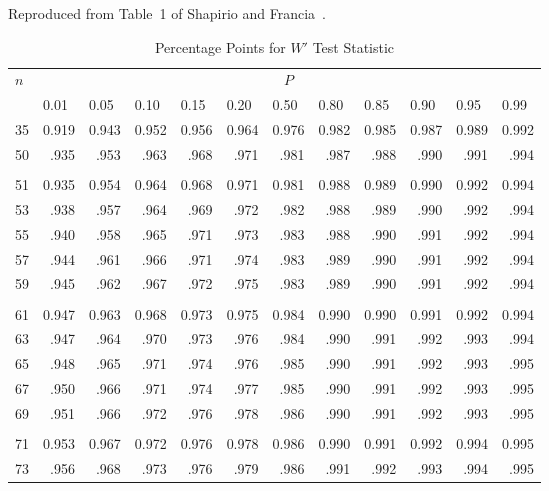 \documentclass[draft]{article}
\begin{document}
\begin{table}
\caption{Percentage Points for \(W'\) Test Statistic}
\centerline{Reproduced from Table~1 of Shapirio and Francia~\cite{shapiro72b}.}
\label{tbl:w-prime-test}
\scriptsize
\begin{center}
\begin{tabular}{l@{\extracolsep{1pt}}r%
                 @{\extracolsep{1pt}}r%
                 @{\extracolsep{1pt}}r%
                 @{\extracolsep{1pt}}rrrrrrrr}\hline
\(n\) & \multicolumn{11}{c}{\(P\)} \\ \cline{2-12}
&
\multicolumn{1}{l}{0.01} & 
\multicolumn{1}{l}{0.05} & 
\multicolumn{1}{l}{0.10} & 
\multicolumn{1}{l}{0.15} & 
\multicolumn{1}{l}{0.20} & 
\multicolumn{1}{l}{0.50} & 
\multicolumn{1}{l}{0.80} & 
\multicolumn{1}{l}{0.85} & 
\multicolumn{1}{l}{0.90} & 
\multicolumn{1}{l}{0.95} & 
\multicolumn{1}{l}{0.99}\\
\hline
35&0.919&0.943&0.952&0.956&0.964&0.976&0.982&0.985&0.987&0.989&0.992\\
50& .935& .953& .963& .968& .971& .981& .987& .988& .990& .991& .994\\
\\
51&0.935&0.954&0.964&0.968&0.971&0.981&0.988&0.989&0.990&0.992&0.994\\
53& .938& .957& .964& .969& .972& .982& .988& .989& .990& .992& .994\\
55& .940& .958& .965& .971& .973& .983& .988& .990& .991& .992& .994\\
57& .944& .961& .966& .971& .974& .983& .989& .990& .991& .992& .994\\
59& .945& .962& .967& .972& .975& .983& .989& .990& .991& .992& .994\\
\\
61&0.947&0.963&0.968&0.973&0.975&0.984&0.990&0.990&0.991&0.992&0.994\\
63& .947& .964& .970& .973& .976& .984& .990& .991& .992& .993& .994\\
65& .948& .965& .971& .974& .976& .985& .990& .991& .992& .993& .995\\
67& .950& .966& .971& .974& .977& .985& .990& .991& .992& .993& .995\\
69& .951& .966& .972& .976& .978& .986& .990& .991& .992& .993& .995\\
\\
71&0.953&0.967&0.972&0.976&0.978&0.986&0.990&0.991&0.992&0.994&0.995\\
73& .956& .968& .973& .976& .979& .986& .991& .992& .993& .994& .995\\

\end{tabular}
\end{center}
\end{table}
\end{document}
